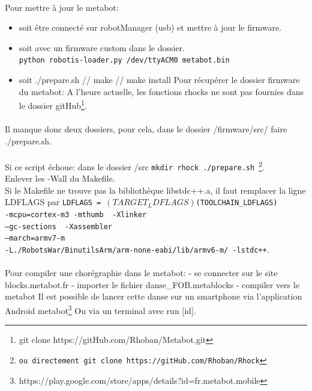\documentclass[10pt,a4paper]{report}
\begin{document}
\begin{appendices}
\paragraph{}
Pour mettre à jour le metabot:
\begin{itemize}
\item soit être connecté sur robotManager (usb) et mettre à jour le firmware.
\item soit avec un firmware custom dans le dossier.\\
    \texttt{python robotis-loader.py /dev/ttyACM0 metabot.bin}
\item soit ./prepare.sh // make // make install
Pour récupérer le dossier firmware du metabot:
A l'heure actuelle, les fonctions rhocks ne sont pas fournies dans le dossier  gitHub\footnote{git clone https://gitHub.com/Rhoban/Metabot.git}.
\end{itemize}

\paragraph{}
Il manque donc deux dossiers, pour cela, dans le dossier /firmware/src/ faire ./prepare.sh.
\paragraph{}
Si ce script échoue: dans le dossier /src \texttt{mkdir rhock ./prepare.sh \footnote{ou directement git clone https://gitHub.com/Rhoban/Rhock}}. \\
Enlever les -Wall du Makefile.\\
Si le Makefile ne trouve pas la bibliothèque libstdc++.a, il faut remplacer la ligne LDFLAGS par  
\texttt{LDFLAGS = $(TARGET_LDFLAGS) $(TOOLCHAIN\_LDFLAGS)\\ 
-mcpu=cortex-m3 -mthumb \ -Xlinker\\ 
--gc-sections \ -Xassembler\\
--march=armv7-m \ \\
-L./RobotsWar/BinutilsArm/arm-none-eabi/lib/armv6-m/ -lstdc++}.
\paragraph{}
Pour compiler une chorégraphie dans le metabot:
- se connecter sur le site blocks.metabot.fr
- importer le fichier danse\_FOB.metablocks
- compiler vers le metabot
Il est possible de lancer cette danse sur un smartphone via l'application Android metabot\footnote{https://play.google.com/store/apps/details?id=fr.metabot.mobile} Ou via un terminal avec run [id].

\end{appendices}
\end{document}

